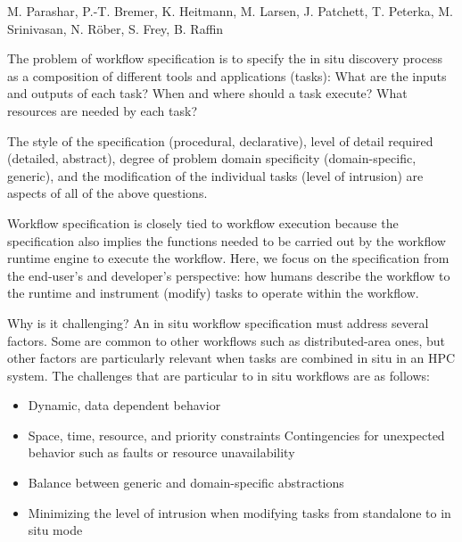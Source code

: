 \license

 M. Parashar, P.-T. Bremer, K. Heitmann, M. Larsen, J. Patchett, T. Peterka, M. Srinivasan, N. Röber, S. Frey, B. Raffin

\begin{refsection}

The problem of workflow specification is to specify the in situ discovery process as a composition of different tools and applications (tasks): What are the inputs and outputs of each task? When and where should a task execute? What resources are needed by each task?

The style of the specification (procedural, declarative), level of detail required (detailed, abstract),  degree of problem domain specificity (domain-specific, generic), and the modification of the individual tasks (level of intrusion) are aspects of all of the above questions.

Workflow specification is closely tied to workflow execution because the specification also implies the functions needed to be carried out by the workflow runtime engine to execute the workflow. Here, we focus on the specification from the end-user’s and developer’s perspective: how humans describe the workflow to the runtime and instrument (modify) tasks to operate within the workflow.

Why is it challenging?
An in situ workflow specification must address several factors. Some are common to other workflows such as distributed-area ones, but other factors are particularly relevant when tasks are combined in situ in an HPC system. The challenges that are particular to in situ workflows are as follows:
\begin{itemize}
\item Dynamic, data dependent behavior
\item Space, time, resource, and priority constraints
Contingencies for unexpected behavior such as faults or resource unavailability
\item Balance between generic and domain-specific abstractions
\item Minimizing the level of intrusion when modifying tasks from standalone to in situ mode
\end{itemize}


\end{refsection}
